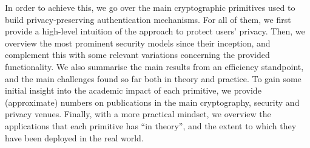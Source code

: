 In order to achieve this, %
we go over the main cryptographic primitives used to build privacy-preserving
authentication mechanisms. For all of them, we first provide a high-level
intuition of the approach to protect users' privacy. Then, we overview the
most prominent security models since their inception, and complement this
with some relevant variations concerning the provided functionality. We also
summarise the main results from an efficiency standpoint, and the main
challenges found so far both in theory and practice. To gain some initial
insight into the academic impact of each primitive, we provide (approximate)
numbers on publications in the main cryptography, security and privacy venues.
Finally, with a more practical mindset, we overview the applications that each
primitive has ``in theory'', and the extent to which they have been deployed
in the real world.



